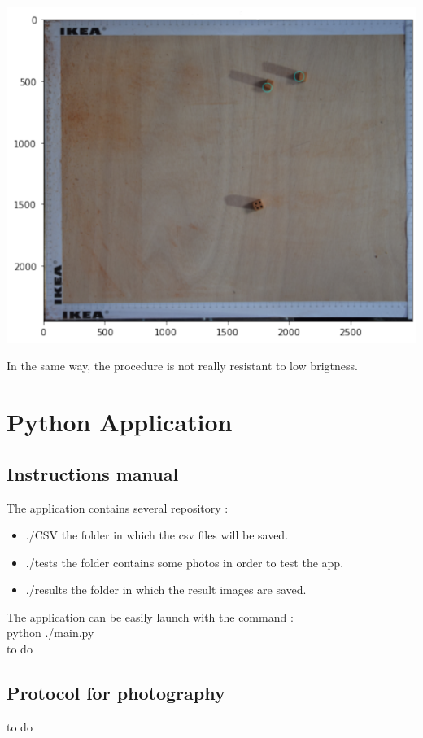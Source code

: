 \documentclass{article}
\begin{document}
\begin{minipage}{.6\textwidth}%
\includegraphics[width=\textwidth]{images/img37.png}
\end{minipage}%
\hfill
\begin{minipage}{.35\textwidth}%
In the same way, the procedure is not really resistant to low brigtness.
\end{minipage}%

\section{Python Application}

\subsection{Instructions manual}

The application contains several repository :\\
\begin{itemize}
\item ./CSV   the folder in which the csv files will be saved.
\item ./tests  the folder contains some photos in order to  test the app.
\item ./results  the folder in which the result images are saved.
\end{itemize}

The application can be easily launch with the command : \\
python ./main.py\\

to do



\subsection{Protocol for photography}

to do
\end{document}
